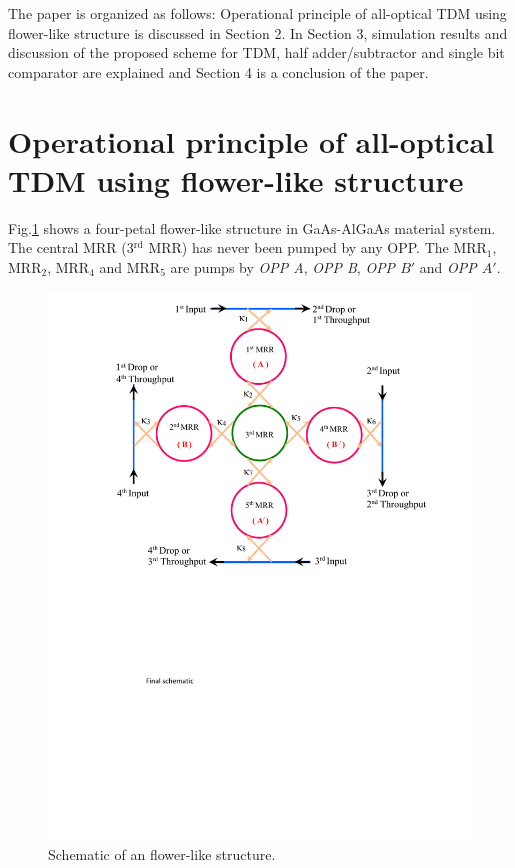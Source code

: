 \documentclass{osa-article}
\begin{document}
The paper is organized as follows: Operational principle of all-optical TDM using flower-like structure is discussed in Section 2. In Section 3, simulation results and discussion of the proposed scheme for TDM, half adder/subtractor and single bit comparator are explained and Section 4 is a conclusion of the paper.

\section{ Operational principle of all-optical TDM using flower-like structure}
\label{} 
Fig.\ref{fig1_flower} shows a four-petal flower-like structure in GaAs-AlGaAs material system. The central MRR (3$^{\text{rd}}$ MRR) has never been pumped by any OPP. The MRR$_1$, MRR$_2$, MRR$_4$ and MRR$_5$ are pumps by \textit{OPP A}, \textit{OPP B}, \textit{OPP $B'$} and \textit{OPP $A'$}.
\begin{figure}[tb]
\centering
	\includegraphics[width=4 in]{figs/fig1_flower.pdf}
	\caption{Schematic of an flower-like structure.}
	\label{fig1_flower}
\end{figure}
\end{document}
